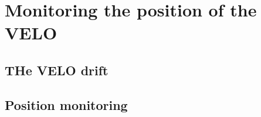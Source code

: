 
\chapter{Monitoring the position of the VELO}
\label{chp:pos_VELO}

\section{THe VELO drift}

\section{Position monitoring}
